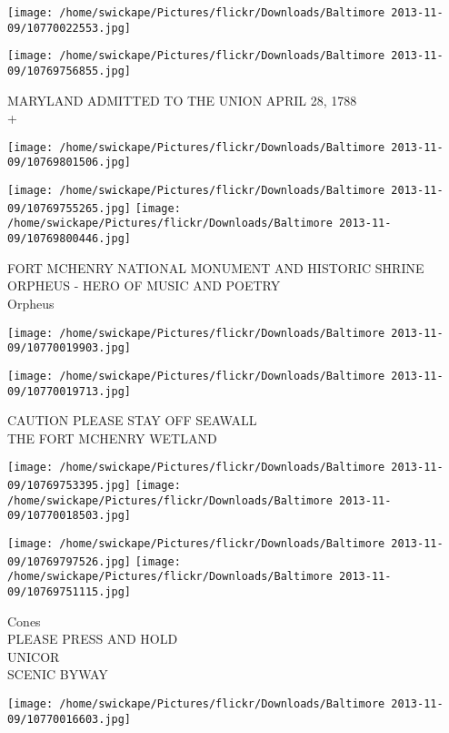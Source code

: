 \documentclass[10pt,letterpaper]{article}
\begin{document}
\texttt{[image: /home/swickape/Pictures/flickr/Downloads/Baltimore 2013-11-09/10770022553.jpg]}

\vspace{0.25in}
\texttt{[image: /home/swickape/Pictures/flickr/Downloads/Baltimore 2013-11-09/10769756855.jpg]}

MARYLAND ADMITTED TO THE UNION APRIL 28, 1788\\
+
\pagebreak

\texttt{[image: /home/swickape/Pictures/flickr/Downloads/Baltimore 2013-11-09/10769801506.jpg]}

\vspace{0.25in}
\texttt{[image: /home/swickape/Pictures/flickr/Downloads/Baltimore 2013-11-09/10769755265.jpg]}
\texttt{[image: /home/swickape/Pictures/flickr/Downloads/Baltimore 2013-11-09/10769800446.jpg]}

FORT MCHENRY NATIONAL MONUMENT AND HISTORIC SHRINE\\
ORPHEUS {-} HERO OF MUSIC AND POETRY\\
Orpheus
\pagebreak

\texttt{[image: /home/swickape/Pictures/flickr/Downloads/Baltimore 2013-11-09/10770019903.jpg]}

\vspace{0.25in}
\texttt{[image: /home/swickape/Pictures/flickr/Downloads/Baltimore 2013-11-09/10770019713.jpg]}

CAUTION PLEASE STAY OFF SEAWALL\\
THE FORT MCHENRY WETLAND
\pagebreak

\texttt{[image: /home/swickape/Pictures/flickr/Downloads/Baltimore 2013-11-09/10769753395.jpg]}
\texttt{[image: /home/swickape/Pictures/flickr/Downloads/Baltimore 2013-11-09/10770018503.jpg]}

\texttt{[image: /home/swickape/Pictures/flickr/Downloads/Baltimore 2013-11-09/10769797526.jpg]}
\texttt{[image: /home/swickape/Pictures/flickr/Downloads/Baltimore 2013-11-09/10769751115.jpg]}

Cones\\
PLEASE PRESS AND HOLD\\
UNICOR\\
SCENIC BYWAY
\pagebreak

\texttt{[image: /home/swickape/Pictures/flickr/Downloads/Baltimore 2013-11-09/10770016603.jpg]}
\end{document}
